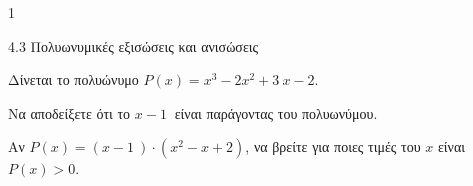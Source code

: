 \begin{ylh}{1}
\item 4.3 Πολυωνυμικές εξισώσεις και ανισώσεις
\end{ylh}
Δίνεται το πολυώνυμο $P(x) = x^{3} - 2x^{2} + 3\ x - 2$.
\begin{alist}
\item Να αποδείξετε ότι το $x - 1\ $ είναι παράγοντας του πολυωνύμου.
\item Αν $P(x) = (x - 1\ ) \cdot (x^{2} - x + 2)$, να βρείτε για ποιες τιμές του $x$ είναι $P(x) > 0$.
\end{alist}


